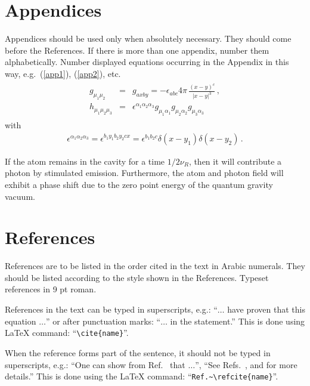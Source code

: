 \documentclass{ws-ijmpd}
\begin{document}
\appendix

\section{Appendices}

Appendices should be used only when absolutely necessary. They
should come\break
before the References. If there is more than one
appendix, number them alphabetically. Number displayed equations
occurring in the Appendix in this way, e.g.~(\ref{app1}),\break
(\ref{app2}), etc.
\begin{eqnarray}	%
\begin{array}{rcl}
g_{\mu_1\mu_2} &=& g_{axby}=-\displaystyle{\epsilon_{abc}}{4\pi}\,
\frac{(x-y)^c}{|x-y|^3}\,, \\[8pt]
h_{\mu_1\mu_2\mu_3} &=& \epsilon^{\alpha_1 \alpha_2 \alpha_3}
g_{\mu_1\alpha_1}g_{\mu_2\alpha_2}g_{\mu_3\alpha_3}
\end{array}
\label{app1}
\end{eqnarray}
with
\begin{eqnarray}	%
\epsilon^{\alpha_1 \alpha_2 \alpha_3} = \epsilon^{b_1y_1b_2y_2cx} =
\epsilon^{b_1b_2c}\delta(x-y_1)\delta(x-y_2)\,.
\label{app2}
\end{eqnarray}

If the atom remains in the cavity for a time $1/2\nu_R$, then it will
contribute a photon by stimulated emission.
Furthermore, the atom and photon field will exhibit a phase shift due
to the zero point energy of the quantum gravity vacuum.

\section{References}

References are to be listed in the order cited in the text in Arabic
numerals.  They should be listed according to the style shown in the
References. Typeset references in 9 pt roman.

References in the text can be typed in superscripts,
e.g.: ``$\ldots$ have proven\cite{edbk,rvo,seri} that
this equation $\ldots$'' or after punctuation marks:
``$\ldots$ in the statement.\cite{seri}'' This is
done using LaTeX command: ``\verb|\cite{name}|''.

When the reference forms part of the sentence, it should not
be typed in superscripts, e.g.: ``One can show from
Ref.~ that $\ldots$'', ``See
Refs.~, 
and  for more details.''
This is done using the LaTeX
command: ``\verb|Ref.~\refcite{name}|''.
\end{document}
